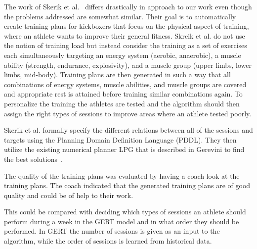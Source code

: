 The work of Skerik et al.~\cite{skerik2018automated} differs drastically in approach to our work even though the problems addressed are somewhat similar.
Their goal is to automatically create training plans for kickboxers that focus on the physical aspect of training, where an athlete wants to improve their general fitness.
Skreik et al. do not use the notion of training load but instead consider the training as a set of exercises each simultaneously targeting an energy system (aerobic, anaerobic), a muscle ability (strength, endurance, explosivity), and a muscle group (upper limbs, lower limbs, mid-body).
Training plans are then generated in such a way that all combinations of energy systems, muscle abilities, and muscle groups are covered and appropriate rest is attained before training similar combinations again.
To personalize the training the athletes are tested and the algorithm should then assign the right types of sessions to improve areas where an athlete tested poorly.

Skerik et al. formally specify the different relations between all of the sessions and targets using the Planning Domain Definition Language (PDDL).
They then utilize the existing numerical planner LPG that is described in Gerevini to find the best solutions~\cite{gerevini2003planning}.

The quality of the training plans was evaluated by having a coach look at the training plans. The coach indicated that the generated training plans are of good quality and could be of help to their work.

This could be compared with deciding which types of sessions an athlete should perform during a week in the GERT model and in what order they should be performed.
In GERT the number of sessions is given as an input to the algorithm, while the order of sessions is learned from historical data.
